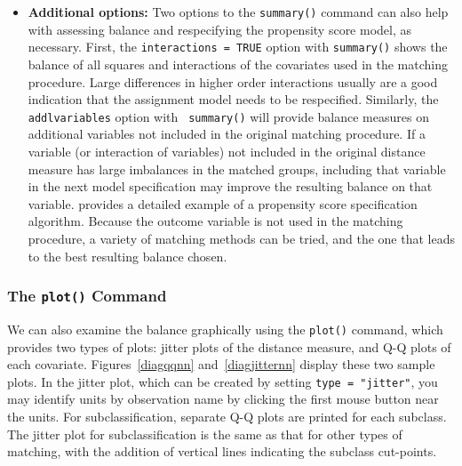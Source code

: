 \begin{itemize}
\item {\bf Additional options:} Two options to the \texttt{summary()}
  command can also help with assessing balance and respecifying the
  propensity score model, as necessary.  First, the {\tt interactions
    = TRUE} option with {\tt summary()} shows the balance of all
  squares and interactions of the covariates used in the matching
  procedure.  Large differences in higher order interactions usually
  are a good indication that the assignment model needs to be
  respecified.  Similarly, the {\tt addlvariables} option with {\tt
    summary()} will provide balance measures on additional variables
  not included in the original matching procedure.  If a variable (or
  interaction of variables) not included in the original distance
  measure has large imbalances in the matched groups, including that
  variable in the next model specification may improve the resulting
  balance on that variable.  \cite{DehWah99} provides a detailed
  example of a propensity score specification algorithm.  Because the
  outcome variable is not used in the matching procedure, a variety of
  matching methods can be tried, and the one that leads to the best
  resulting balance chosen.
\end{itemize}

\subsubsection{The \texttt{plot()} Command}

We can also examine the balance graphically using the \texttt{plot()}
command, which provides two types of plots: jitter plots of the
distance measure, and Q-Q plots of each covariate.
Figures~\ref{diagqqnn} and~\ref{diagjitternn} display these two sample
plots.  In the jitter plot, which can be created by setting
\texttt{type = "jitter"}, you may identify units by observation name
by clicking the first mouse button near the units. For
subclassification, separate Q-Q plots are printed for each subclass.
The jitter plot for subclassification is the same as that for other types of matching, with
the addition of vertical lines indicating the subclass cut-points.

